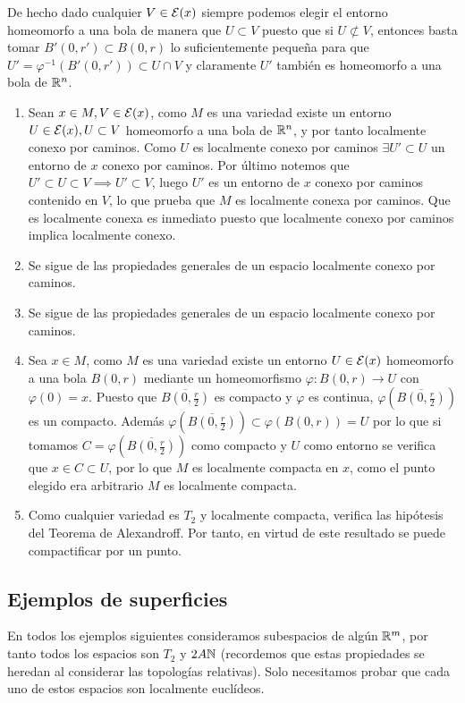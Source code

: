 {  De hecho dado cualquier $V\in\mathcal{E}(x)$ siempre podemos elegir el entorno homeomorfo a una bola de manera que $U\subset V$ puesto que si $U\not\subset V$, entonces basta tomar $B'(0,r')\subset B(0,r)$ lo suficientemente pequeña para que $U'=\varphi^{-1}(B'(0,r'))\subset U\cap V$ y claramente $U'$ también es homeomorfo a una bola de $\mathbb{R}^n$.
    \begin{enumerate}
      \item Sean $x\in M, V\in\mathcal{E}(x)$, como $M$ es una variedad existe un entorno $U\in\mathcal{E}(x),U\subset V$ homeomorfo a una bola de $\mathbb{R}^n$, y por tanto localmente conexo por caminos. Como $U$ es localmente conexo por caminos $\exists U'\subset U$ un entorno de $x$ conexo por caminos. Por último notemos que $U'\subset U\subset V\implies U'\subset V$, luego $U'$ es un entorno de $x$ conexo por caminos contenido en $V$, lo que prueba que $M$ es localmente conexa por caminos. Que es localmente conexa es inmediato puesto que localmente conexo por caminos implica localmente conexo. 
      \item Se sigue de las propiedades generales de un espacio localmente conexo por caminos.
      \item Se sigue de las propiedades generales de un espacio localmente conexo por caminos.
      \item Sea $x\in M$, como $M$ es una variedad existe un entorno $U\in\mathcal{E}(x)$ homeomorfo a una bola $B(0,r)$ mediante un homeomorfismo $\varphi : B(0,r)\rightarrow U $ con $\varphi(0) = x$. Puesto que $\overline{B(0,\frac{r}{2})}$ es compacto y $\varphi$ es continua, $\varphi(\overline{B(0,\frac{r}{2})})$ es un compacto. Además $\varphi(\overline{B(0,\frac{r}{2})})\subset\varphi(B(0,r))=U$ por lo que si tomamos $C=\varphi(\overline{B(0,\frac{r}{2})})$ como compacto y $U$ como entorno se verifica que $x\in C\subset U$, por lo que $M$ es localmente compacta en $x$, como el punto elegido era arbitrario $M$ es localmente compacta.
      \item Como cualquier variedad es $T_2$ y localmente compacta, verifica las hipótesis del Teorema de Alexandroff. Por tanto, en virtud de este resultado se puede compactificar por un punto.
    \end{enumerate}
}

\clearpage

\subsection{Ejemplos de superficies}

En todos los ejemplos siguientes consideramos subespacios de algún $\mathbb{R}^m$, por tanto todos los espacios son $T_2$ y $2A\mathbb{N}$ (recordemos que estas propiedades se heredan al considerar las topologías relativas). Solo necesitamos probar que cada uno de estos espacios son localmente euclídeos.

